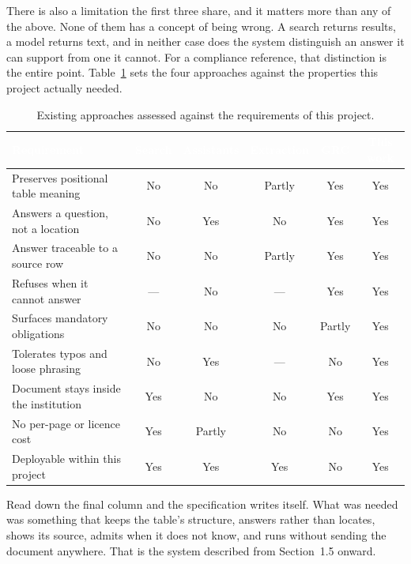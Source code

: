 There is also a limitation the first three share, and it matters more than any
of the above. None of them has a concept of being wrong. A search returns
results, a model returns text, and in neither case does the system distinguish
an answer it can support from one it cannot. For a compliance reference, that
distinction is the entire point. Table~\ref{tab:existing} sets the four
approaches against the properties this project actually needed.

\begin{table}[h]
\centering
\caption{Existing approaches assessed against the requirements of this project.}
\label{tab:existing}
\small
\begin{tabular}{|p{}|c|c|c|c|c|}
\hline
\rowcolor{myblue}
\textcolor{white}{\textbf{Requirement}} &
\textcolor{white}{\textbf{Search}} &
\textcolor{white}{\textbf{Assistants}} &
\textcolor{white}{\textbf{Extraction}} &
\textcolor{white}{\textbf{GRC}} &
\textcolor{white}{\textbf{This work}} \\
\hline
Preserves positional table meaning & No & No & Partly & Yes & Yes \\ \hline
Answers a question, not a location & No & Yes & No & Yes & Yes \\ \hline
Answer traceable to a source row & No & No & Partly & Yes & Yes \\ \hline
Refuses when it cannot answer & --- & No & --- & Yes & Yes \\ \hline
Surfaces mandatory obligations & No & No & No & Partly & Yes \\ \hline
Tolerates typos and loose phrasing & No & Yes & --- & No & Yes \\ \hline
Document stays inside the institution & Yes & No & No & Yes & Yes \\ \hline
No per-page or licence cost & Yes & Partly & No & No & Yes \\ \hline
Deployable within this project & Yes & Yes & Yes & No & Yes \\ \hline
\end{tabular}
\end{table}

Read down the final column and the specification writes itself. What was needed
was something that keeps the table's structure, answers rather than locates,
shows its source, admits when it does not know, and runs without sending the
document anywhere. That is the system described from Section~1.5 onward.
